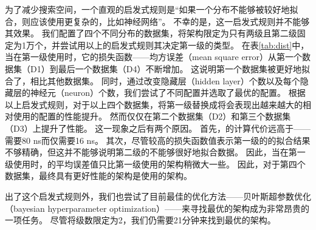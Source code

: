 为了减少搜索空间，一个直观的启发式规则是``如果一个分布不能够被{\lr}较好地拟合，则应该使用更复杂的{\model}，比如神经网络''。
不幸的是，这一启发式规则并不能够其效果。
我们配置了四个不同分布的数据集，将{\li}架构限定为只有两级且第二级固定为1万个{\lr}，并尝试用以上的启发式规则其决定第一级的{\model}类型。
在表\ref{tab:dist}中，当在第一级使用{\lr}时，它的损失函数{------}均方误差（mean square error）从第一个数据集（D1）到最后一个数据集（D4）不断增加。
这说明第一个数据集被{\lr}更好地拟合了，相比其他数据集。
同时，通过改变隐藏层（hidden layer）个数以及每个隐藏层的神经元（neuron）个数，我们尝试了不同{\nn}配置并选取了最优的{\nn}配置。
根据以上启发式规则，对于以上四个数据集，将第一级{\model}替换成{\nn}将会表现出越来越大的相对使用{\lr}的{\li}配置的性能提升。
然而{\nn}仅仅在第二个数据集（D2）和第三个数据集（D3）上提升了性能。
这一现象之后有两个原因。
首先，{\nn}的计算代价远高于{\lr}{------}{\nn}需要80 ns而{\lr}仅需要16 ns。
其次，尽管较高的损失函数值表示第一级的{\lr}的拟合结果不够精确，但这并不能够说明第二级的{\model}不能够很好地拟合数据。
因此，当在第一级使用{\lr}时，{\model}的平均误差值只比第一级使用{\nn}的架构稍微大一些。
因此，对于第四个数据集，最终具有更好性能的架构是使用{\lr}的架构。


出了这个启发式规则外，我们也尝试了目前最佳的优化方法{------}贝叶斯超参数优化（bayesian hyperparameter optimization）{------}来寻找最优的{\li}架构成为非常昂贵的一项任务。
尽管将级数限定为2，我们仍需要21分钟来找到最优的架构。

